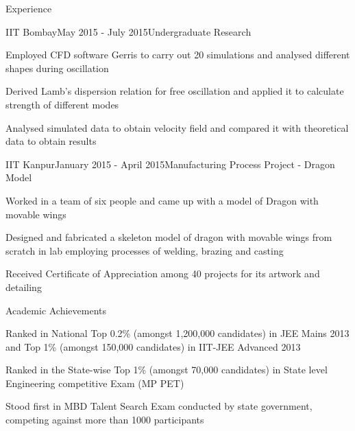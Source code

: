 \documentclass{resume} %
\begin{document}
\begin{rSection}{Experience}

\begin{rSubsection}{IIT Bombay}{May 2015 - July 2015}{Undergraduate Research}{}
\item Employed CFD software Gerris to carry out 20 simulations and analysed different shapes during oscillation
\item Derived Lamb’s dispersion relation for free oscillation and applied it to calculate strength of different modes
\item Analysed simulated data to obtain velocity field and compared it with theoretical data to obtain results
\end{rSubsection}



\begin{rSubsection}{IIT Kanpur}{January 2015 - April 2015}{Manufacturing Process Project - Dragon Model}{}
\item Worked in a team of six people and came up with a model of Dragon with movable wings 
\item Designed and fabricated a skeleton model of dragon with movable wings from scratch in lab employing processes of welding, brazing and casting
\item Received Certificate of Appreciation among 40 projects for its artwork and detailing
\end{rSubsection}

\end{rSection}



\begin{rSection}{Academic Achievements} \itemsep -2pt
\item Ranked in National Top 0.2\% (amongst 1,200,000 candidates) in JEE Mains 2013 and Top 1\% (amongst 150,000 candidates) in IIT-JEE Advanced 2013
\item Ranked in the State-wise Top 1\% (amongst 70,000 candidates) in State level Engineering competitive Exam (MP PET)
\item Stood first in MBD Talent Search Exam conducted by state government, competing against more than 1000 participants  
\end{rSection}
\end{document}
